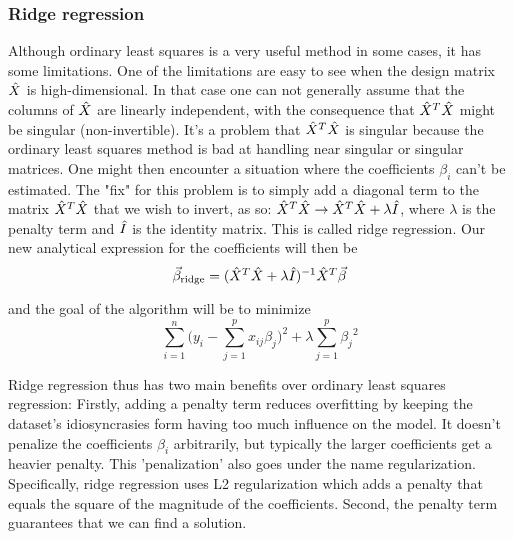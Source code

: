 \documentclass[a4paper,12pt]{article}
\begin{document}
\subsubsection{Ridge regression}
Although ordinary least squares is a very useful method in some cases, it has some limitations. One of the limitations are easy to see when the design matrix $\Hat{X}$ is high-dimensional. In that case one can not generally assume that the columns of $\Hat{X}$ are linearly independent, with the consequence that $\Hat{X}^T\Hat{X}$ might be singular (non-invertible). It's a problem that $\Hat{X}^T\Hat{X}$ is singular because the ordinary least squares method is bad at handling near singular or singular matrices. One might then encounter a situation where the coefficients $\beta_i$ can't be estimated.\newline
The "fix" for this problem is to simply add a diagonal term to the matrix $\Hat{X}^T\Hat{X}$ that we wish to invert, as so: $\Hat{X}^T\Hat{X} \rightarrow \Hat{X}^T\Hat{X} + \lambda \Hat{I}$, where $\lambda$ is the penalty term and $\Hat{I}$ is the identity matrix. This is called ridge regression. Our new analytical expression for the coefficients will then be
\begin{equation}
\vec{\beta}_{\text{ridge}}=(\hat{X}^T\hat{X}+\lambda \Hat{I})^{-1}\hat{X}^T\vec{\beta}
\end{equation}

and the goal of the algorithm will be to minimize
\begin{equation}
\sum_{i=1}^{n}\Big(y_i-\sum_{j=1}^px_{ij}\beta_j\Big)^2+\lambda\sum_{j=1}^p{\beta_j}^2
\end{equation}


Ridge regression thus has two main benefits over ordinary least squares regression:\newline
Firstly, adding a penalty term reduces overfitting by keeping the dataset's idiosyncrasies form having too much influence on the model. It doesn't penalize the coefficients $\beta_i$ arbitrarily, but typically the larger coefficients get a heavier penalty. This 'penalization' also goes under the name regularization. Specifically, ridge regression uses L2 regularization which adds a penalty that equals the square of the magnitude of the coefficients.\newline   
Second, the penalty term guarantees that we can find a solution.
\end{document}
